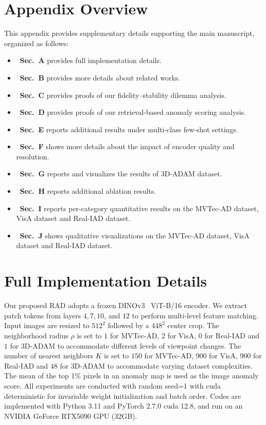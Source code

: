 \documentclass{article}
\theoremstyle{plain}
\theoremstyle{definition}
\theoremstyle{remark}
\begin{document}
\setcounter{figure}{0}
\setcounter{table}{0}
\renewcommand{\thefigure}{A\arabic{figure}}
\renewcommand{\thetable}{A\arabic{table}}


\section*{Appendix Overview}
This appendix provides supplementary details supporting the main manuscript,
organized as follows:

\begin{itemize}[leftmargin=*,label={}]
  \item \textemdash~\textbf{Sec.~A} provides full implementation details.
  \item \textemdash~\textbf{Sec.~B} provides more details about related works.
  \item \textemdash~\textbf{Sec.~C} provides proofs of our fidelity--stability dilemma analysis.
  \item \textemdash~\textbf{Sec.~D} provides proofs of our retrieval-based anomaly scoring analysis.
  \item \textemdash~\textbf{Sec.~E} reports additional results under multi-class few-shot settings.
  \item \textemdash~\textbf{Sec.~F} shows more details about the impact of encoder quality and resolution.
  \item \textemdash~\textbf{Sec.~G} reports and visualizes the results of 3D-ADAM dataset.
  \item \textemdash~\textbf{Sec.~H} reports additional ablation results.
  \item \textemdash~\textbf{Sec.~I} reports per-category quantitative results on the MVTec-AD dataset, VisA dataset and Real-IAD dataset.
  \item \textemdash~\textbf{Sec.~J} shows qualitative visualizations on the MVTec-AD dataset, VisA dataset and Real-IAD dataset.
\end{itemize}

\section{Full Implementation Details}
\label{sec:id}
Our proposed RAD adopts a frozen DINOv3~\cite{simeoni2025dinov3} ViT-B/16 encoder. We extract patch tokens from layers $4, 7, 10$, and $12$ to perform multi-level feature matching. Input images are resized to $512^2$ followed by a $448^2$ center crop. The neighborhood radius $\rho$ is set to $1$ for MVTec-AD, $2$ for VisA, $0$ for Real-IAD and $1$ for 3D-ADAM to accommodate different levels of viewpoint changes. The number of nearest neighbors $K$ is set to $150$ for MVTec-AD, $900$ for VisA, $900$ for Real-IAD and $48$ for 3D-ADAM to accommodate varying dataset complexities. The mean of the top 1\% pixels in an anomaly map is used
as the image anomaly score. All experiments are conducted
with random seed=1 with cuda deterministic for invariable
weight initialization and batch order. Codes are implemented with Python 3.11 and PyTorch 2.7.0 cuda 12.8, and
run on an NVIDIA GeForce RTX5090 GPU (32GB).
\end{document}
